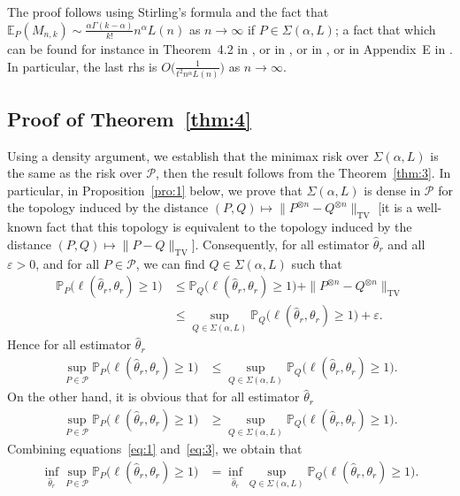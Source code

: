 \documentclass{article}
\newcommand{\1}{\boldsymbol{1}}
\newcommand{\EE}{\mathbb{E}}
\newcommand{\PP}{\mathbb{P}}
\theoremstyle{plain}
\begin{document}
The proof follows using Stirling's formula and the fact that $\EE_P(M_{n,k}) \sim \frac{\alpha \Gamma(k - \alpha)}{k!} n^{\alpha}L(n)$ as $n \to \infty$ if $P \in \Sigma(\alpha,L)$; a fact that
which can be found for instance in Theorem~4.2 in \cite{Ben(17)}, or in \cite{Kar(67)}, or in \cite{Gne(07)}, or in Appendix~E in \cite{Fav(22)}. In particular, the last rhs is $O\big( \frac{1}{t^2n^{\alpha}L(n)} \big)$ as $n \to \infty$.



\subsection{Proof of Theorem~\ref{thm:4}}
\label{sec:proof-thm:4}

Using a density argument, we establish that the minimax risk over $\Sigma(\alpha,L)$ is the same as the risk over $\mathcal{P}$, then the result follows from the Theorem~\ref{thm:3}. In particular, in Proposition~\ref{pro:1} below, we prove that $\Sigma(\alpha,L)$ is dense in $\mathcal{P}$ for the topology induced by the distance $(P,Q) \mapsto \|P^{\otimes n} - Q^{\otimes n}\|_{\mathrm{TV}}$ [it is a well-known fact that this topology is equivalent to the topology induced by the distance $(P,Q) \mapsto \|P - Q\|_{\mathrm{TV}}$]. Consequently, for all estimator $\hat{\theta}_r$ and all $\varepsilon > 0$, and for all $P\in \mathcal{P}$, we can find $Q \in \Sigma(\alpha,L)$ such that
\begin{align*}
  \PP_P\big( \ell(\hat{\theta}_r,\theta_r) \geq 1 \big)%
  &\leq \PP_Q\big( \ell(\hat{\theta}_r,\theta_r) \geq 1 \big)%
    + \|P^{\otimes n} - Q^{\otimes n}\|_{\mathrm{TV}}\\
  &\leq \sup_{Q\in \Sigma(\alpha,L)}\PP_Q\big( \ell(\hat{\theta}_r,\theta_r) \geq 1 \big)%
    + \varepsilon.
\end{align*}
Hence for all estimator $\hat{\theta}_r$
\begin{align}
  \label{eq:1}
  \sup_{P\in \mathcal{P}}\PP_P\big( \ell(\hat{\theta}_r,\theta_r) \geq 1 \big)%
  &\leq \sup_{Q\in \Sigma(\alpha,L)}\PP_Q\big( \ell(\hat{\theta}_r,\theta_r) \geq 1 \big).
\end{align}
On the other hand, it is obvious that for all estimator $\hat{\theta}_r$
\begin{align}
  \label{eq:3}
  \sup_{P\in \mathcal{P}}\PP_P\big( \ell(\hat{\theta}_r,\theta_r) \geq 1 \big)%
  &\geq \sup_{Q\in \Sigma(\alpha,L)}\PP_Q\big( \ell(\hat{\theta}_r,\theta_r) \geq 1 \big).
\end{align}
Combining equations~\eqref{eq:1} and~\eqref{eq:3}, we obtain that
\begin{align*}
  \inf_{\hat{\theta}_r}\sup_{P\in \mathcal{P}} \PP_P\big( \ell(\hat{\theta}_r,\theta_r) \geq 1 \big)%
  &= \inf_{\hat{\theta}_r}\sup_{Q\in \Sigma(\alpha,L)} \PP_Q\big( \ell(\hat{\theta}_r,\theta_r) \geq 1 \big).
\end{align*}
\end{document}
